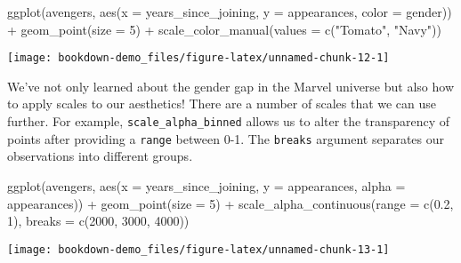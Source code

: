 \documentclass[
]{book}
\newenvironment{Shaded}{\begin{snugshade}}{\end{snugshade}}
\newcommand{\AttributeTok}[1]{\textcolor[rgb]{0.77,0.63,0.00}{#1}}
\newcommand{\DecValTok}[1]{\textcolor[rgb]{0.00,0.00,0.81}{#1}}
\newcommand{\FloatTok}[1]{\textcolor[rgb]{0.00,0.00,0.81}{#1}}
\newcommand{\FunctionTok}[1]{\textcolor[rgb]{0.00,0.00,0.00}{#1}}
\newcommand{\NormalTok}[1]{#1}
\newcommand{\SpecialCharTok}[1]{\textcolor[rgb]{0.00,0.00,0.00}{#1}}
\newcommand{\StringTok}[1]{\textcolor[rgb]{0.31,0.60,0.02}{#1}}
\begin{document}
\begin{Shaded}
\begin{Highlighting}[]
\FunctionTok{ggplot}\NormalTok{(avengers, }\FunctionTok{aes}\NormalTok{(}\AttributeTok{x =}\NormalTok{ years\_since\_joining,}
                     \AttributeTok{y =}\NormalTok{ appearances,}
                     \AttributeTok{color =}\NormalTok{ gender)) }\SpecialCharTok{+}
  \FunctionTok{geom\_point}\NormalTok{(}\AttributeTok{size =} \DecValTok{5}\NormalTok{) }\SpecialCharTok{+}
  \FunctionTok{scale\_color\_manual}\NormalTok{(}\AttributeTok{values =} \FunctionTok{c}\NormalTok{(}\StringTok{"Tomato"}\NormalTok{, }\StringTok{"Navy"}\NormalTok{))}
\end{Highlighting}
\end{Shaded}

\begin{center}\texttt{[image: bookdown-demo\_files/figure-latex/unnamed-chunk-12-1]} \end{center}

We've not only learned about the gender gap in the Marvel universe but also how to apply scales to our aesthetics! There are a number of scales that we can use further. For example, \texttt{scale\_alpha\_binned} allows us to alter the transparency of points after providing a \texttt{range} between 0-1. The \texttt{breaks} argument separates our observations into different groups.

\begin{Shaded}
\begin{Highlighting}[]
\FunctionTok{ggplot}\NormalTok{(avengers, }\FunctionTok{aes}\NormalTok{(}\AttributeTok{x =}\NormalTok{ years\_since\_joining,}
                     \AttributeTok{y =}\NormalTok{ appearances,}
                     \AttributeTok{alpha =}\NormalTok{ appearances)) }\SpecialCharTok{+}
  \FunctionTok{geom\_point}\NormalTok{(}\AttributeTok{size =} \DecValTok{5}\NormalTok{) }\SpecialCharTok{+}
  \FunctionTok{scale\_alpha\_continuous}\NormalTok{(}\AttributeTok{range =} \FunctionTok{c}\NormalTok{(}\FloatTok{0.2}\NormalTok{, }\DecValTok{1}\NormalTok{),}
                         \AttributeTok{breaks =} \FunctionTok{c}\NormalTok{(}\DecValTok{2000}\NormalTok{, }\DecValTok{3000}\NormalTok{, }\DecValTok{4000}\NormalTok{))}
\end{Highlighting}
\end{Shaded}

\begin{center}\texttt{[image: bookdown-demo\_files/figure-latex/unnamed-chunk-13-1]} \end{center}
\end{document}
